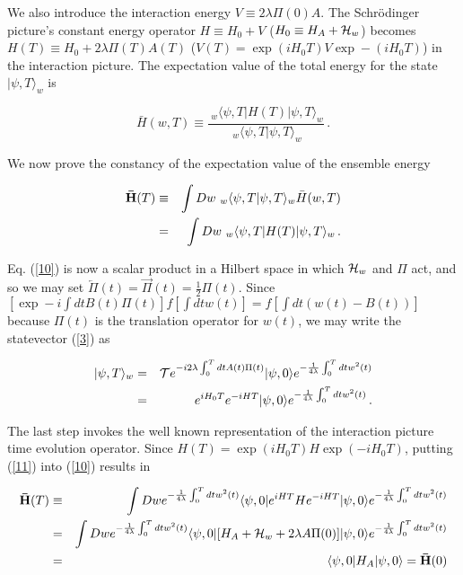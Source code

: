 \documentclass{article}
\begin{document}
	We also introduce the interaction energy $V\equiv 2\lambda \Pi (0) A$. 
The Schr\"odinger picture's constant energy operator 
$H\equiv H_{0} +V$ ($H_{0}\equiv H_{A}+{\cal H}_{w}$) 
 becomes $H(T)\equiv H_{0}+2\lambda \Pi(T) A(T)$  
($V(T)=\exp (iH_{0}T)V\exp-(iH_{0}T)$) in the interaction picture. 
The expectation value of the total energy for the state $|\psi,T\rangle _{w}$ is

\begin{equation}\label{9}
\bar{H}(w,T)\equiv \frac{\ _{w}\langle \psi,T|H(T)|\psi,T\rangle _{w}}
{\ _{w}\langle \psi,T|\psi,T\rangle _{w}}\, .
\end{equation}

	We now prove the constancy of the expectation value of the ensemble energy 
	
\begin{eqnarray}\label{10}
{\bf \bar{H}}(T)&\equiv&\int 
Dw \ _{w}\langle \psi,T|\psi,T\rangle _{w}\bar{H}(w,T)\nonumber\\
&=&\int Dw \ _{w}\langle \psi,T|H(T)|\psi,T\rangle _{w}\, .
\end{eqnarray}

\noindent Eq. (\ref{10}) is now a scalar product in a Hilbert space in 
which ${\cal H}_{w}$ and $\Pi$ act, and so we may set 
$\overleftarrow\Pi (t)=\overrightarrow\Pi (t)=\frac{1}{2}\Pi (t)$.  Since 
$[\exp-i\int dt B(t)\Pi (t)]f[\int dt w(t)]=f[\int dt (w(t)-B(t))]$ because 
$\Pi (t)$ is the translation operator for $w(t)$,  
we may write the statevector (\ref{3}) as 

\begin{eqnarray}\label{11}
|\psi,T\rangle _{w}&=&{\cal T}e^{-i2\lambda\int_{0}^{T}dtA(t)\Pi (t)}
|\psi,0\rangle e^{-\frac{1}{4\lambda}\int_{0}^{T}dtw^{2}(t)}\nonumber\\
&=&e^{iH_{0}T}e^{-iHT}|\psi,0\rangle 
e^{-\frac{1}{4\lambda}\int_{0}^{T}dtw^{2}(t)}\, .	
\end{eqnarray}

\noindent The last step invokes the well known representation 
of the interaction picture time evolution operator. Since 
$H(T)=\exp(iH_{0}T)H\exp(-iH_{0}T)$, putting (\ref{11}) into (\ref{10}) results in 

\begin{eqnarray}\label{12}
{\bf \bar{H}}(T)&\equiv&\int 
Dw e^{-\frac{1}{4\lambda}\int_{0}^{T}dtw^{2}(t)}\langle \psi,0|
e^{iHT}He^{-iHT}|\psi,0\rangle e^{-\frac{1}{4\lambda}\int_{0}^{T}dtw^{2}(t)}\nonumber\\
&=&\int Dw e^{-\frac{1}{4\lambda}\int_{0}^{T}dtw^{2}(t)}
\langle \psi,0|[H_{A}+{\cal H}_{w}+2\lambda A \Pi(0)]|\psi,0\rangle 
e^{-\frac{1}{4\lambda}\int_{0}^{T}dtw^{2}(t)}\nonumber\\
&=&\langle \psi,0|H_{A}|\psi,0\rangle ={\bf \bar{H}}(0)
\end{eqnarray}
\end{document}
